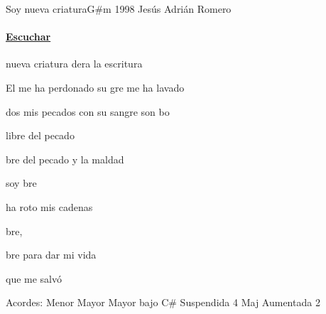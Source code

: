 \documentclass[12pt, spanish]{book}
\begin{document}
    \begin{song}{Soy nueva criatura}{G\#m}
        {1998} %
        {Jesús Adrián Romero}
        {} %
        {}
        \ifChordBk
        \paragraph{\mbox{}\hfill\protect\href{https://open.spotify.com/intl-es/track/6GDJugv7mx48voVUYcb2Vf}{Escuchar}\mbox{}\hfill}
        \fi


        \begin{SBOpGroup}
             nueva criatura  dera la escritura

            El me ha perdonado  su gre me ha lavado

            dos mis pecados con su sangre son bo

            libre  del pecado
        \end{SBOpGroup}

        \begin{SBChorus}
            bre del pecado y la maldad

            soy bre

             ha roto mis cadenas

            bre,

            bre para dar mi vida

             que me salvó
        \end{SBChorus}


        \ifChordBk
        \begin{SBOpGroup}
            Acordes:\break
             Menor \hfill
             Mayor \hfill\null\break
             Mayor bajo C\# \hfill
             Suspendida 4 \hfill\null\break
             Maj \hfill
             Aumentada 2 \hfill\null\break
        \end{SBOpGroup}
        \fi
    \end{song}
\end{document}
